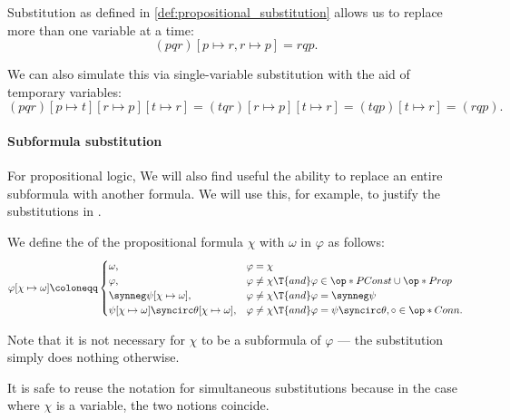 \begin{remark}\label{rem:simulating_simultaneous_substitution}
  Substitution as defined in \cref{def:propositional_substitution} allows us to replace more than one variable at a time:
  \begin{equation*}
    (pqr)[p \mapsto r, r \mapsto p]
    =
    rqp.
  \end{equation*}

  We can also simulate this via single-variable substitution with the aid of temporary variables:
  \begin{equation*}
    (pqr)[p \mapsto t][r \mapsto p][t \mapsto r]
    =
    (tqr)[r \mapsto p][t \mapsto r]
    =
    (tqp)[t \mapsto r]
    =
    (rqp).
  \end{equation*}
\end{remark}

\paragraph{Subformula substitution}

For propositional logic, We will also find useful the ability to replace an entire subformula with another formula. We will use this, for example, to justify the substitutions in .

\begin{definition}\label{def:propositional_subformula_substitution}
  We define the  of the propositional formula \( \chi \) with \( \omega \) in \( \varphi \) as follows:
  \begin{equation}\label{eq:def:propositional_subformula_substitution}
    \varphi[\chi \mapsto \omega] \coloneqq \begin{cases}
      \omega,                                                         &\varphi = \chi \\
      \varphi,                                                        &\varphi \neq \chi \T{and} \varphi \in \op*{PConst} \cup \op*{Prop} \\
      \synneg \psi[\chi \mapsto \omega],                              &\varphi \neq \chi \T{and} \varphi = \synneg \psi \\
      \psi[\chi \mapsto \omega] \syncirc \theta[\chi \mapsto \omega], &\varphi \neq \chi \T{and} \varphi = \psi \syncirc \theta, \circ \in \op*{Conn}.
    \end{cases}
  \end{equation}
\end{definition}
\begin{comments}
  \item Note that it is not necessary for \( \chi \) to be a subformula of \( \varphi \) --- the substitution simply does nothing otherwise.
  \item It is safe to reuse the notation for simultaneous substitutions because in the case where \( \chi \) is a variable, the two notions coincide.
\end{comments}

